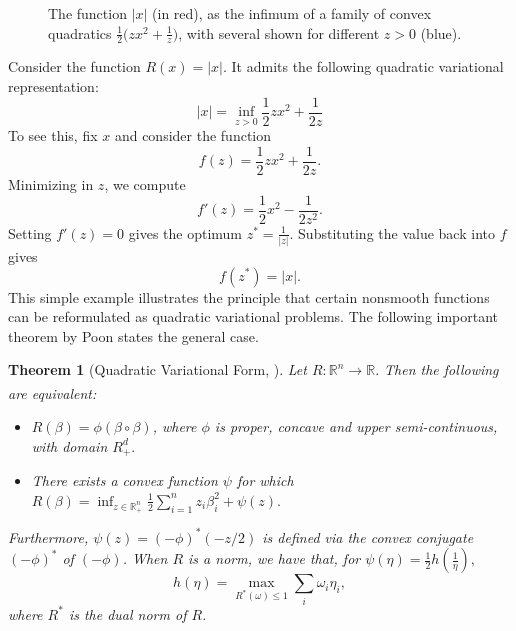 \documentclass[11pt, twoside]{report}
\newtheorem{theorem}{Theorem}[section]
\begin{document}
\begin{figure}[h!]
    \centering
    \caption{The function $|x|$ (in red), as the infimum of a family of convex quadratics $\tfrac12\big(z x^2 + \tfrac{1}{z}\big)$, with several shown for different $z>0$ (blue).}
    \label{fig:variational_abs}
\end{figure}
Consider the function $R(x) = |x|$. It admits the following quadratic variational representation:
$$|x| = \inf_{z>0}  \frac{1}{2}zx^2 + \frac{1}{2z}$$
To see this, fix $x$ and consider the function
$$f(z) = \frac{1}{2}zx^2 + \frac{1}{2z}.$$
Minimizing in $z$, we compute
$$f'(z) = \frac{1}{2}x^2 - \frac{1}{2z^2}.$$
Setting $f'(z) = 0$ gives the optimum $z^* = \frac{1}{|z|}$. Substituting the value back into $f$ gives
$$f(z^*) = |x|.$$ This simple example illustrates the principle that certain nonsmooth functions can be reformulated as quadratic variational problems. The following important theorem by Poon\cite{poon} states the general case.
\begin{theorem}[Quadratic Variational Form, \cite{poon}] \label{qvf_thm}
Let $R:\mathbb{R}^n \xrightarrow[]{} \mathbb{R}.$ Then the following are equivalent:
\begin{itemize}
    \item $R(\beta) = \phi(\beta \circ \beta)$, where $\phi$ is proper, concave and upper semi-continuous, with domain $R^d_+.$
    \item There exists a convex function $\psi$ for which $R(\beta) = \inf_{z \in \mathbb{R}^n_+} \frac{1}{2} \sum_{i=1}^n z_i \beta_i^2 + \psi(z).$
\end{itemize}
Furthermore, $\psi(z) = (-\phi)^* (-z/2)$ is defined via the convex conjugate $(-\phi)^*$ of $(-\phi)$. When $R$ is a norm, we have that, for $\psi(\eta) = \frac{1}{2} h(\frac{1}{\eta}),$
\[h(\eta) = \max_{R^*(\omega) \leq 1} \sum_i \omega_i \eta_i,\]
where $R^*$ is the dual norm of $R$.
\end{theorem}
\end{document}
